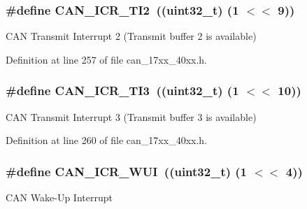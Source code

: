 \subsubsection[{\texorpdfstring{C\+A\+N\+\_\+\+I\+C\+R\+\_\+\+T\+I2}{CAN_ICR_TI2}}]{\setlength{\rightskip}{0pt plus 5cm}\#define C\+A\+N\+\_\+\+I\+C\+R\+\_\+\+T\+I2~((uint32\+\_\+t) (1 $<$$<$ 9))}\hypertarget{group__CAN__17XX__40XX_gad43c387e2fbc22cc95c3b3803e5e890f}{}\label{group__CAN__17XX__40XX_gad43c387e2fbc22cc95c3b3803e5e890f}
C\+AN Transmit Interrupt 2 (Transmit buffer 2 is available) 

Definition at line 257 of file can\+\_\+17xx\+\_\+40xx.\+h.

\subsubsection[{\texorpdfstring{C\+A\+N\+\_\+\+I\+C\+R\+\_\+\+T\+I3}{CAN_ICR_TI3}}]{\setlength{\rightskip}{0pt plus 5cm}\#define C\+A\+N\+\_\+\+I\+C\+R\+\_\+\+T\+I3~((uint32\+\_\+t) (1 $<$$<$ 10))}\hypertarget{group__CAN__17XX__40XX_ga82d809099125ff45ae2f404eea9113a0}{}\label{group__CAN__17XX__40XX_ga82d809099125ff45ae2f404eea9113a0}
C\+AN Transmit Interrupt 3 (Transmit buffer 3 is available) 

Definition at line 260 of file can\+\_\+17xx\+\_\+40xx.\+h.

\subsubsection[{\texorpdfstring{C\+A\+N\+\_\+\+I\+C\+R\+\_\+\+W\+UI}{CAN_ICR_WUI}}]{\setlength{\rightskip}{0pt plus 5cm}\#define C\+A\+N\+\_\+\+I\+C\+R\+\_\+\+W\+UI~((uint32\+\_\+t) (1 $<$$<$ 4))}\hypertarget{group__CAN__17XX__40XX_gaf0e24df45c2cc58b8b05c8475c0dbc0f}{}\label{group__CAN__17XX__40XX_gaf0e24df45c2cc58b8b05c8475c0dbc0f}
C\+AN Wake-\/\+Up Interrupt 

